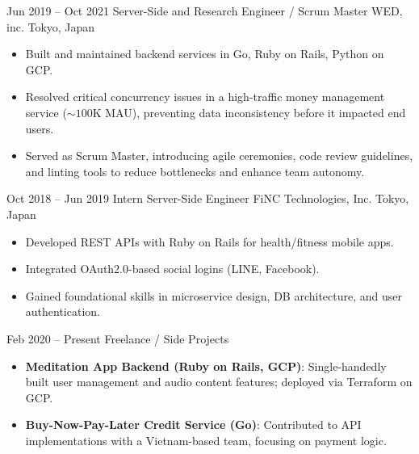 \documentclass[11pt,letterpaper]{moderncv}
\begin{document}
\cventry
    {Jun 2019 -- Oct 2021}
    {Server-Side and Research Engineer / Scrum Master}
    {WED, inc.}
    {Tokyo, Japan}
    {}
    {
      \begin{itemize}
        \item Built and maintained backend services in Go, Ruby on Rails, Python on GCP.
        \item Resolved critical concurrency issues in a high-traffic money management service ($\sim100\mathrm{K}$ MAU), preventing data inconsistency before it impacted end users.
        \item Served as Scrum Master, introducing agile ceremonies, code review guidelines, and linting tools to reduce bottlenecks and enhance team autonomy.
      \end{itemize}
    }

\cventry
    {Oct 2018 -- Jun 2019}
    {Intern Server-Side Engineer}
    {FiNC Technologies, Inc.}
    {Tokyo, Japan}
    {}
    {
      \begin{itemize}
        \item Developed REST APIs with Ruby on Rails for health/fitness mobile apps.
        \item Integrated OAuth2.0-based social logins (LINE, Facebook).
        \item Gained foundational skills in microservice design, DB architecture, and user authentication.
      \end{itemize}
    }

\cventry
    {Feb 2020 -- Present}
    {Freelance / Side Projects}
    {}
    {}
    {}
    {
      \begin{itemize}
        \item \textbf{Meditation App Backend (Ruby on Rails, GCP)}:
        Single-handedly built user management and audio content features; deployed via Terraform on GCP.
        \item \textbf{Buy-Now-Pay-Later Credit Service (Go)}:
        Contributed to API implementations with a Vietnam-based team, focusing on payment logic.
      \end{itemize}
    }

\end{document}
